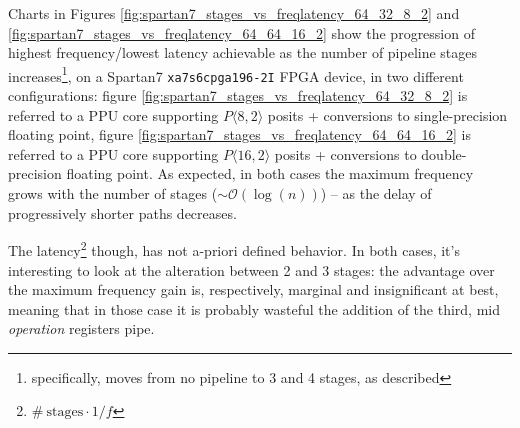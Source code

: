 Charts in Figures \ref{fig:spartan7_stages_vs_freqlatency_64_32_8_2} and \ref{fig:spartan7_stages_vs_freqlatency_64_64_16_2} show the progression of highest frequency/lowest latency achievable as the number of pipeline stages increases\footnote{specifically, moves from no pipeline to 3 and 4 stages, as described}, on a Spartan7 \texttt{xa7s6cpga196-2I} FPGA device, in two different configurations: figure \ref{fig:spartan7_stages_vs_freqlatency_64_32_8_2} is referred to a  PPU core supporting $P\langle8,2\rangle$ posits + conversions to single-precision floating point, figure \ref{fig:spartan7_stages_vs_freqlatency_64_64_16_2} is referred to a PPU core supporting $P\langle16,2\rangle$ posits + conversions to double-precision floating point.
As expected, in both cases the maximum frequency grows with the number of stages ($\sim \mathcal{O}(\log(n))$) -- as the delay of progressively shorter paths decreases.

The latency\footnote{$\#\ \text{stages} \cdot 1/f$} though, has not a-priori defined behavior.
In both cases, it's interesting to look at the alteration between 2 and 3 stages: the advantage over the maximum frequency gain is, respectively, marginal and insignificant at best, meaning that in those case it is probably wasteful the addition of the third, mid \textit{operation} registers pipe.





